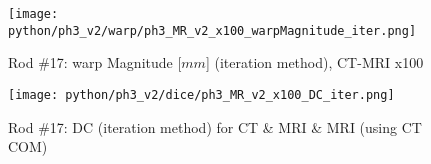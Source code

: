 \begin{figure}[!tp]
    \centering
    \texttt{[image: python/ph3\_v2/warp/ph3\_MR\_v2\_x100\_warpMagnitude\_iter.png]}
    \caption{Rod \#17: warp Magnitude [$mm$] (iteration method), CT-MRI x100}
    \label{fig:ph3_warpMagnitude_x100}
\end{figure}

\begin{figure}[!bp]
     \centering
     \texttt{[image: python/ph3\_v2/dice/ph3\_MR\_v2\_x100\_DC\_iter.png]}
     \caption{Rod \#17: DC (iteration method) for CT \& MRI \& MRI (using CT COM)}
     \label{fig:ph3_DC_x100}
\end{figure}

